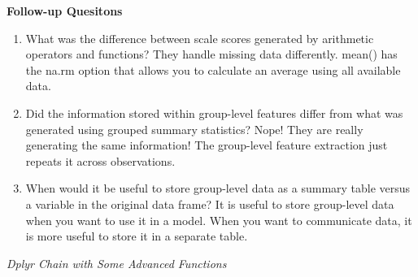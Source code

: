 \documentclass[]{book}
\theoremstyle{definition}
\theoremstyle{definition}
\theoremstyle{definition}
\theoremstyle{remark}
\begin{document}
\textbf{Follow-up Quesitons}

\begin{enumerate}
\def\labelenumi{\arabic{enumi}.}
\item
  What was the difference between scale scores generated by arithmetic operators and functions?
  They handle missing data differently. mean() has the na.rm option that allows you to calculate an average using all available data.
\item
  Did the information stored within group-level features differ from what was generated using grouped summary statistics?
  Nope! They are really generating the same information! The group-level feature extraction just repeats it across observations.
\item
  When would it be useful to store group-level data as a summary table versus a variable in the original data frame?
  It is useful to store group-level data when you want to use it in a model. When you want to communicate data, it is more useful to store it in a separate table.
\end{enumerate}

\emph{Dplyr Chain with Some Advanced Functions}
\end{document}

